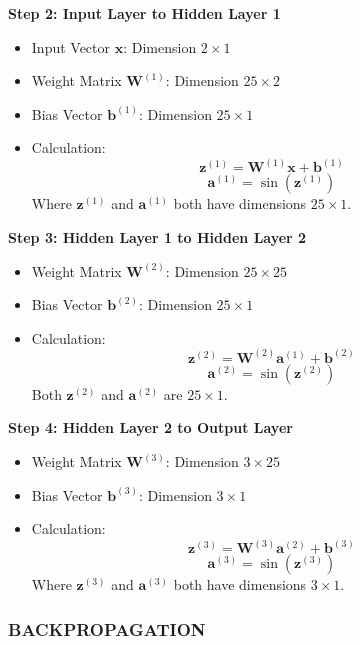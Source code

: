 \documentclass{ioereport}
\begin{document}
\textbf{Step 2: Input Layer to Hidden Layer 1}
\begin{itemize}
  \item Input Vector $\mathbf{x}$: Dimension $2 \times 1$
  \item Weight Matrix $\mathbf{W}^{(1)}$: Dimension $25 \times 2$
  \item Bias Vector $\mathbf{b}^{(1)}$: Dimension $25 \times 1$
  \item Calculation:
  \[
  \mathbf{z}^{(1)} = \mathbf{W}^{(1)} \mathbf{x} + \mathbf{b}^{(1)}
  \]
  \[
  \mathbf{a}^{(1)} = \sin(\mathbf{z}^{(1)})
  \]
  Where $\mathbf{z}^{(1)}$ and $\mathbf{a}^{(1)}$ both have dimensions $25 \times 1$.
\end{itemize}

\textbf{Step 3: Hidden Layer 1 to Hidden Layer 2}
\begin{itemize}
  \item Weight Matrix $\mathbf{W}^{(2)}$: Dimension $25 \times 25$
  \item Bias Vector $\mathbf{b}^{(2)}$: Dimension $25 \times 1$
  \item Calculation:
  \[
  \mathbf{z}^{(2)} = \mathbf{W}^{(2)} \mathbf{a}^{(1)} + \mathbf{b}^{(2)}
  \]
  \[
  \mathbf{a}^{(2)} = \sin(\mathbf{z}^{(2)})
  \]
  Both $\mathbf{z}^{(2)}$ and $\mathbf{a}^{(2)}$ are $25 \times 1$.
\end{itemize}

\textbf{Step 4: Hidden Layer 2 to Output Layer}
\begin{itemize}
  \item Weight Matrix $\mathbf{W}^{(3)}$: Dimension $3 \times 25$
  \item Bias Vector $\mathbf{b}^{(3)}$: Dimension $3 \times 1$
  \item Calculation:
  \[
  \mathbf{z}^{(3)} = \mathbf{W}^{(3)} \mathbf{a}^{(2)} + \mathbf{b}^{(3)}
  \]
  \[
  \mathbf{a}^{(3)} = \sin(\mathbf{z}^{(3)})
  \]
  Where $\mathbf{z}^{(3)}$ and $\mathbf{a}^{(3)}$ both have dimensions $3 \times 1$.
\end{itemize}


\subsubsection*{\MakeUppercase{Backpropagation}}
\end{document}
